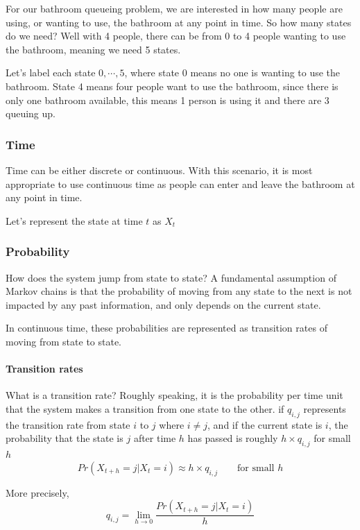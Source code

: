 For our bathroom queueing problem, we are interested in how many people are using, or wanting to use, the bathroom at any point in time. So how many states do we need? Well with 4 people, there can be from 0 to 4 people wanting to use the bathroom, meaning we need 5 states. 

Let's label each state $0, \cdots, 5$, where state 0 means no one is wanting to use the bathroom. State 4 means four people want to use the bathroom, since there is only one bathroom available, this means 1 person is using it and there are 3 queuing up.

\subsubsection*{Time}
Time can be either discrete or continuous. With this scenario, it is most appropriate to use continuous time as people can enter and leave the bathroom at any point in time.

Let's represent the state at time $t$ as $X_t$

\subsubsection*{Probability}
How does the system jump from state to state? A fundamental assumption of Markov chains is that the probability of moving from any state to the next is not impacted by any past information, and only depends on the current state.

In continuous time, these probabilities are represented as transition rates of moving from state to state.

\paragraph{Transition rates}
What is a transition rate? Roughly speaking, it is the probability per time unit that the system makes a transition from one state to the other. 
if $q_{i,j}$ represents the transition rate from state $i$ to $j$ where $i\neq j$, and if the current state is $i$, the probability that the state is $j$ after time $h$ has passed is roughly $h\times q_{i,j}$ for small $h$
$$ Pr(X_{t+h} = j|X_t = i) \approx h\times q_{i,j} \qquad \text{for small } h$$

More precisely,
$$ q_{i,j} = \lim_{h\rightarrow0}\frac{Pr(X_{t+h} = j | X_t = i)}{h} $$

